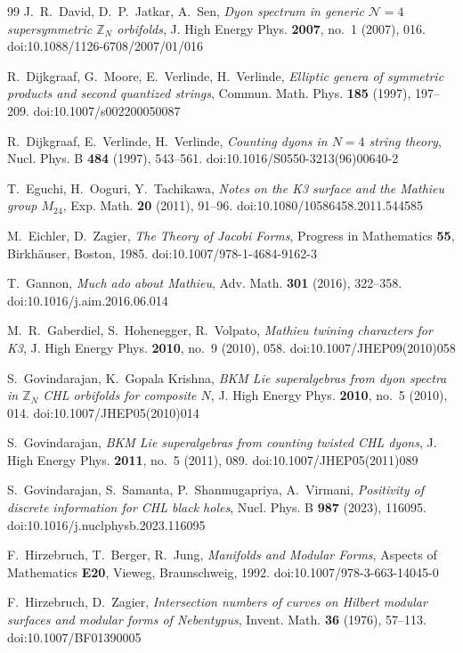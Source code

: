 \documentclass[11pt]{amsart}
\theoremstyle{definition}
\begin{document}
\begin{thebibliography}{99}
 J.~R.~David, D.~P.~Jatkar, A.~Sen, \emph{Dyon spectrum in generic $\mathcal N=4$ supersymmetric $\mathbb Z_N$ orbifolds}, J. High Energy Phys. \textbf{2007}, no.~1 (2007), 016. doi:10.1088/1126-6708/2007/01/016

 R.~Dijkgraaf, G.~Moore, E.~Verlinde, H.~Verlinde, \emph{Elliptic genera of symmetric products and second quantized strings}, Commun. Math. Phys. \textbf{185} (1997), 197--209. doi:10.1007/s002200050087

 R.~Dijkgraaf, E.~Verlinde, H.~Verlinde, \emph{Counting dyons in $N=4$ string theory}, Nucl. Phys. B \textbf{484} (1997), 543--561. doi:10.1016/S0550-3213(96)00640-2

 T.~Eguchi, H.~Ooguri, Y.~Tachikawa, \emph{Notes on the K3 surface and the Mathieu group $M_{24}$}, Exp. Math. \textbf{20} (2011), 91--96. doi:10.1080/10586458.2011.544585

 M.~Eichler, D.~Zagier, \emph{The Theory of Jacobi Forms}, Progress in Mathematics \textbf{55}, Birkh\"auser, Boston, 1985. doi:10.1007/978-1-4684-9162-3

 T.~Gannon, \emph{Much ado about Mathieu}, Adv. Math. \textbf{301} (2016), 322--358. doi:10.1016/j.aim.2016.06.014

 M.~R.~Gaberdiel, S.~Hohenegger, R.~Volpato, \emph{Mathieu twining characters for K3}, J. High Energy Phys. \textbf{2010}, no.~9 (2010), 058. doi:10.1007/JHEP09(2010)058

 S.~Govindarajan, K.~Gopala Krishna, \emph{BKM Lie superalgebras from dyon spectra in $\mathbb Z_N$ CHL orbifolds for composite $N$}, J. High Energy Phys. \textbf{2010}, no.~5 (2010), 014. doi:10.1007/JHEP05(2010)014

 S.~Govindarajan, \emph{BKM Lie superalgebras from counting twisted CHL dyons}, J. High Energy Phys. \textbf{2011}, no.~5 (2011), 089. doi:10.1007/JHEP05(2011)089

 S.~Govindarajan, S.~Samanta, P.~Shanmugapriya, A.~Virmani, \emph{Positivity of discrete information for CHL black holes}, Nucl. Phys. B \textbf{987} (2023), 116095. doi:10.1016/j.nuclphysb.2023.116095

 F.~Hirzebruch, T.~Berger, R.~Jung, \emph{Manifolds and Modular Forms}, Aspects of Mathematics \textbf{E20}, Vieweg, Braunschweig, 1992. doi:10.1007/978-3-663-14045-0

 F.~Hirzebruch, D.~Zagier, \emph{Intersection numbers of curves on Hilbert modular surfaces and modular forms of Nebentypus}, Invent. Math. \textbf{36} (1976), 57--113. doi:10.1007/BF01390005


\end{thebibliography}
\end{document}
